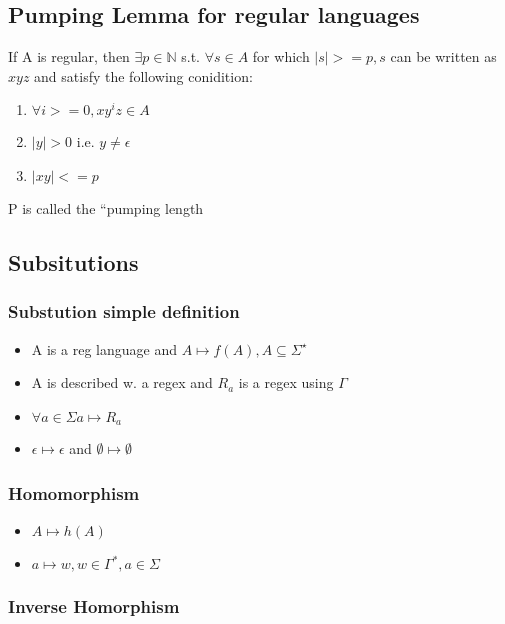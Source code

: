 \documentclass[11pt]{article}
\begin{document}
\subsection{Pumping Lemma for regular languages}
\label{sec-2.5}

  If A is regular, then $\exists p \in \mathbb{N}$ s.t. $\forall s
   \in A$ for which $|s| >= p, s$ can be written as  $xyz$ and
   satisfy the following conidition:
\begin{enumerate}
\item $\forall i >= 0, x y^i z \in A$
\item $|y|>0$ i.e. $y \neq \epsilon$
\item $|xy| <= p$
\end{enumerate}
  P is called the ``pumping length

\subsection{Subsitutions}
\label{sec-2.6}

\subsubsection{Substution simple definition}
\label{sec-2.6.1}

\begin{itemize}
\item A is a reg language and $A \mapsto f(A), A \subseteq \Sigma^{\star}$
\item A is described w. a regex and $R_a$ is a regex using $\Gamma$
\item $\forall a \in \Sigma a \mapsto R_a$
\item $\epsilon \mapsto \epsilon$ and $\emptyset \mapsto \emptyset$
\end{itemize}
\subsubsection{Homomorphism}
\label{sec-2.6.2}

\begin{itemize}
\item $A \mapsto h(A)$
\item $a \mapsto w, w \in \Gamma^*, a\in \Sigma$
\end{itemize}
\subsubsection{Inverse Homorphism}
\label{sec-2.6.3}
\end{document}
